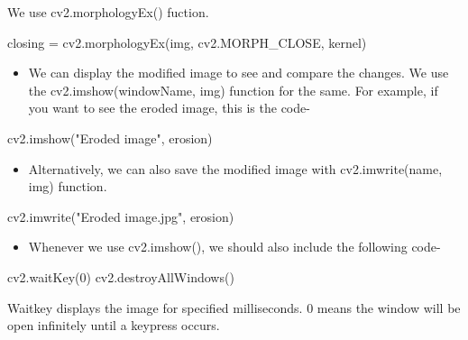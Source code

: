 \documentclass[]{article}
\newenvironment{Shaded}{}{}
\newcommand{\DecValTok}[1]{\textcolor[rgb]{0.25,0.63,0.44}{{#1}}}
\newcommand{\StringTok}[1]{\textcolor[rgb]{0.25,0.44,0.63}{{#1}}}
\newcommand{\OperatorTok}[1]{\textcolor[rgb]{0.40,0.40,0.40}{{#1}}}
\newcommand{\NormalTok}[1]{{#1}}
\providecommand{\tightlist}{%
  \setlength{\itemsep}{0pt}\setlength{\parskip}{0pt}}
\begin{document}
We use cv2.morphologyEx() fuction.

\begin{Shaded}
\begin{Highlighting}[]
    \NormalTok{closing }\OperatorTok{=} \NormalTok{cv2.morphologyEx(img, cv2.MORPH_CLOSE, kernel)}
\end{Highlighting}
\end{Shaded}

\begin{itemize}
\tightlist
\item
  We can display the modified image to see and compare the changes. We
  use the cv2.imshow(windowName, img) function for the same. For
  example, if you want to see the eroded image, this is the code-
\end{itemize}

\begin{Shaded}
\begin{Highlighting}[]
    \NormalTok{cv2.imshow(}\StringTok{"Eroded image"}\NormalTok{, erosion)}
\end{Highlighting}
\end{Shaded}

\begin{itemize}
\tightlist
\item
  Alternatively, we can also save the modified image with
  cv2.imwrite(name, img) function.
\end{itemize}

\begin{Shaded}
\begin{Highlighting}[]
    \NormalTok{cv2.imwrite(}\StringTok{"Eroded image.jpg"}\NormalTok{, erosion)}
\end{Highlighting}
\end{Shaded}

\begin{itemize}
\tightlist
\item
  Whenever we use cv2.imshow(), we should also include the following
  code-
\end{itemize}

\begin{Shaded}
\begin{Highlighting}[]
    \NormalTok{cv2.waitKey(}\DecValTok{0}\NormalTok{)}
    \NormalTok{cv2.destroyAllWindows()}
    
\end{Highlighting}
\end{Shaded}

Waitkey displays the image for specified milliseconds. 0 means the
window will be open infinitely until a keypress occurs.
\end{document}
